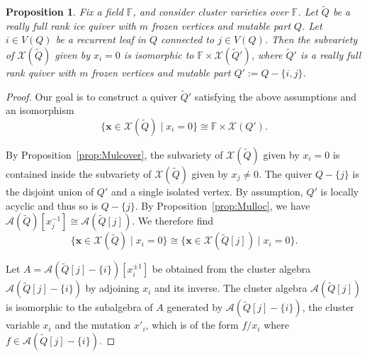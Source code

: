 \documentclass[11pt]{article}
\newtheorem{proposition}[theo]{Proposition}
\theoremstyle{definition}
\numberwithin{equation}{section}
\newcommand\Acal{\mathcal{A}}\newcommand\Bcal{\mathcal{B}}\newcommand\Ccal{\mathcal{C}}\newcommand\Dcal{\mathcal{D}}\newcommand\Ecal{\mathcal{E}}\newcommand\Fcal{\mathcal{F}}\newcommand\Gcal{\mathcal{G}}\newcommand\Hcal{\mathcal{H}}\newcommand\Ical{\mathcal{I}}\newcommand\Jcal{\mathcal{J}}\newcommand\Kcal{\mathcal{K}}\newcommand\Lcal{\mathcal{L}}\newcommand\Mcal{\mathcal{M}}\newcommand\Ncal{\mathcal{N}}\newcommand\Ocal{\mathcal{O}}\newcommand\Pcal{\mathcal{P}}\newcommand\Qcal{\mathcal{Q}}\newcommand\Rcal{\mathcal{R}}\newcommand\Scal{\mathcal{S}}\newcommand\Tcal{\mathcal{T}}\newcommand\Ucal{\mathcal{U}}\newcommand\Vcal{\mathcal{V}}\newcommand\Wcal{\mathcal{W}}\newcommand\Xcal{\mathcal{X}}\newcommand\Ycal{\mathcal{Y}}\newcommand\Zcal{\mathcal{Z}}
\newcommand\bx{{\bm{x}}}
\newcommand\Qice{\widetilde{Q}}
\newcommand\F{\mathbb{F}}
\def\Qicefr[#1]{\Qice[#1]}
\newcommand\XQice{\Xcal(\Qice)}
\newcommand\AX{\Acal}
\newcommand\AQice{\Acal(\Qice)}
\newcommand\Ga{\F}
\newcommand\Louise{locally acyclic\xspace}
\newcommand\Louiseleaf{recurrent leaf\xspace}
\begin{document}
\begin{proposition}\label{prop:Louise_leaf}
Fix a field $\Ga$, and consider cluster varieties over $\Ga$.
Let $\Qice$ be a really full rank ice quiver with $m$ frozen vertices and mutable part $Q$. Let $i\in V(Q)$ be a \Louiseleaf in $Q$ connected to $j\in V(Q)$. Then the subvariety of $\XQice$ given by $x_i=0$ is isomorphic to $\Ga\times \Xcal(\Qice')$, where $\Qice'$ is a really full rank quiver with $m$ frozen vertices and mutable part $Q':=Q-\{i,j\}$.
\end{proposition}
\begin{proof}%
Our goal is to construct a quiver $\Qice'$ satisfying the above assumptions and an isomorphism
\begin{equation}\label{eq:leaf1}
  \{\bx\in\Xcal(\Qice)\mid x_i=0\} \cong \F\times \Xcal(Q').
\end{equation}

  By Proposition~\ref{prop:Mulcover}, the subvariety of $\Xcal(\Qice)$ given by $x_i=0$ is contained inside the subvariety of $\XQice$ given by $x_j\neq0$. The quiver $Q-\{j\}$ is the disjoint union of $Q'$ and a single isolated vertex. By assumption, $Q'$ is \Louise and thus so is $Q-\{j\}$. By Proposition~\ref{prop:Mulloc}, we have $\AQice[x_j^{-1}]\cong \AX(\Qicefr[j])$. We therefore find
\begin{equation}\label{eq:leaf2}
    \{\bx\in\Xcal(\Qice)\mid x_i=0\} \cong \{\bx\in\Xcal(\Qicefr[j])\mid x_i=0\}.
\end{equation}

%
Let $A= \AX(\Qicefr[j] - \{i\})[x_i^{\pm 1}]$ be obtained from the cluster algebra $ \AX(\Qicefr[j] - \{i\})$ by adjoining $x_i$ and its inverse.  The cluster algebra $\AX(\Qicefr[j])$ is isomorphic 
%
 to the subalgebra of $A$ generated by $\AX(\Qicefr[j] - \{i\})$, the cluster variable $x_i$ and the mutation $x'_i$, which is of the form $f/x_i$ where $f \in \AX(\Qicefr[j] - \{i\})$.  


\end{proof}
\end{document}
